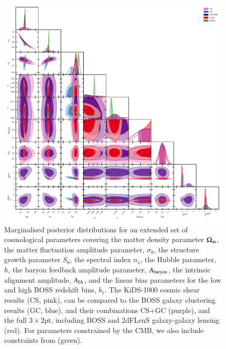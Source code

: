\begin{figure}
	\begin{center}
		\includegraphics[width=\textwidth]{Parameter_Plots/cosmology/omegam_sigma8_s8_ns_h_a_baryon_a_ia_b1l_b1h_blind_A}
		\caption{Marginalised posterior distributions for an extended set of cosmological parameters covering the matter density parameter $\Omega_{\rm m}$, the matter fluctuation amplitude parameter, $\sigma_8$, the structure growth parameter $S_8$, the spectral index $n_s$, the Hubble parameter, $h$, the baryon feedback amplitude parameter, $A_{\rm baryon}$, the intrinsic alignment amplitude, $A_{\rm IA}$, and the linear bias parameters for the low and high BOSS redshift bins, $b_1$.   The KiDS-1000 cosmic shear results (CS, pink), can be compared to the BOSS galaxy clustering results (GC, blue), and their combinations CS+GC (purple), and the full $3\times2$pt, including BOSS and 2dFLenS galaxy-galaxy lensing (red).   For parameters constrained by the CMB, we also include constraints from \citet{planck/etal:2018} (green).}
		\label{fig:cosmology-params-all}
	\end{center}
\end{figure}

